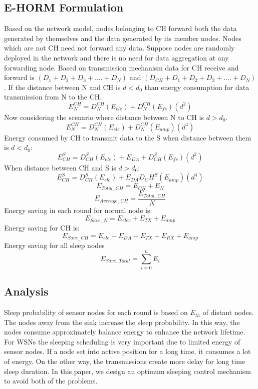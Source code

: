 \documentclass{article}
\begin{document}
\subsection{E-HORM Formulation}
Based on the network model, nodes belonging to CH forward both the data generated by themselves and the data generated by its member nodes. Nodes which are not CH need not forward any data. Suppose nodes are randomly deployed in the network and there is no need for data aggregation at any forwarding node. Based on transmission mechanism data for CH receive and forward is $(D_1+D_2+D_3+....+D_N)$ and $(D_{CH}+D_1+D_2+D_3+....+D_N)$.
If the distance between N and CH is $d<d_0$ than energy consumption for data transmission from N to the CH.
\begin{equation}
E_N^{CH}= D_N^{CH}(E_{ele})+D_N^{CH}(E_{fs})(d^2)
\end{equation}
Now considering the scenario where distance between N to CH is $d>d_0$.
\begin{equation}
E_N^{CH}= D_N^{CH}(E_{ele})+D_N^{CH}(E_{amp})(d^4)
\end{equation}
Energy consumed by CH to transmit data to the S when distance between them is $d<d_0$:
\begin{equation}
  E_{CH}^S= D_{CH}^S(E_{ele})+E_{DA}+D_{CH}^S(E_{fs})(d^2)
\end{equation}
When distance between CH and S is $d>d_0$:
\begin{equation}
  E_{CH}^S= D_{CH}^S(E_{ele})+E_{DA}D_CH^S(E_{amp})(d^4)
\end{equation}
\begin{equation}
  E_{{Total}_-{CH}}=E_{CH}+E_N
\end{equation}
\begin{equation}
  E_{{Average}_-{CH}}=\frac{E_{{Total}_-{CH}}}{N}
\end{equation}
Energy saving in each round for normal node is:
\begin{equation}
  E_{{Save}_-{N}}=E_{elec}+E_{TX}+E_{amp}
\end{equation}
Energy saving for CH is:
\begin{equation}
  E_{{Save}_-{CH}}=E_{ele}+E_{DA}+E_{TX}+E_{RX}+E_{amp}
\end{equation}
Energy saving for all sleep nodes
\begin{equation}
  E_{{Save}_-{Total}}=\sum\limits_{i=0}^n E_i
\end{equation}
\subsection{Analysis}
Sleep probability of sensor nodes for each round is based on $E_{th}$ of distant nodes. The nodes away from the sink increase the sleep probability. In this way, the nodes consume approximately balance energy to enhance the network lifetime.
For WSNs the sleeping scheduling is very important due to limited energy of sensor nodes. If a node set into active position for a long time, it consumes a lot of energy. On the other way, the transmissions create more delay for long time sleep duration. In this paper, we design an optimum sleeping control mechanism to avoid both of the problems.
\end{document}

